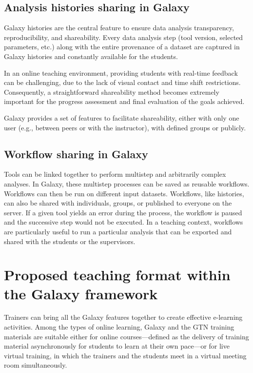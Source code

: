 \subsection*{Analysis histories sharing in Galaxy}

Galaxy histories are the central feature to ensure data analysis transparency, reproducibility, and shareability. Every data analysis step (tool version, selected parameters, etc.) along with the entire provenance of a dataset are captured in Galaxy histories and constantly available for the students.

In an online teaching environment, providing students with real-time feedback can be challenging, due to the lack of visual contact and time shift restrictions. Consequently, a straightforward shareability method becomes extremely important for the progress assessment and final evaluation of the goals achieved.

Galaxy provides a set of features to facilitate shareability, either with only one user (e.g., between peers or with the instructor), with defined groups or publicly.


\subsection*{Workflow sharing in Galaxy}

Tools can be linked together to perform multistep and arbitrarily complex analyses. In Galaxy, these multistep processes can be saved as reusable workflows. Workflows can then be run on different input datasets. Workflows, like histories, can also be shared with individuals, groups, or published to everyone on the server. If a given tool yields an error during the process, the workflow is paused and the successive step would not be executed. In a teaching context, workflows are particularly useful to run a particular analysis that can be exported and shared with the students or the supervisors.


\section*{Proposed teaching format within the Galaxy framework}

Trainers can bring all the Galaxy features together to create effective e-learning activities. Among the types of online learning, Galaxy and the GTN training materials are suitable either for online courses—defined as the delivery of training material asynchronously for students to learn at their own pace—or for live virtual training, in which the trainers and the students meet in a virtual meeting room simultaneously.

